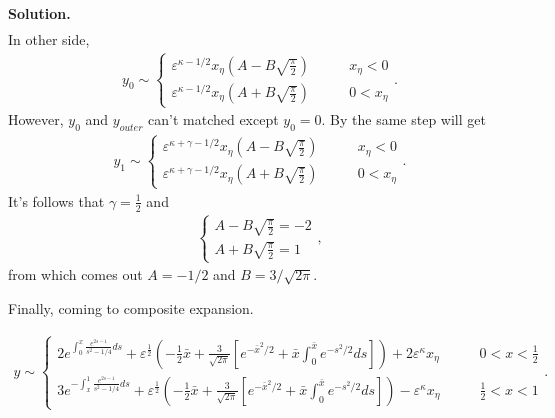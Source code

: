 \documentclass[a4paper]{book}
\newenvironment{solution}%
{\noindent\textbf{Solution.}}%
{\qedhere}
\numberwithin{equation}{chapter}
\theoremstyle{definition}
\begin{document}
\begin{solution}
\begin{align*}
  \end{align*}
  In other side,
  \begin{align*}
    y_0 \sim
    \begin{cases}
      \varepsilon^{\kappa - 1/2}x_\eta (A - B\sqrt{\frac{\pi}{2}})   &\qquad x_\eta < 0  \\
      \varepsilon^{\kappa - 1/2}x_\eta (A + B\sqrt{\frac{\pi}{2}})  &\qquad 0 < x_\eta
    \end{cases}.
  \end{align*}
  However, $y_0$ and $y_{outer}$ can't matched except $y_0 = 0$. By the same step will get
  \begin{align*}
    y_1 \sim
    \begin{cases}
      \varepsilon^{\kappa + \gamma - 1/2}x_\eta (A - B\sqrt{\frac{\pi}{2}})   &\qquad x_\eta < 0  \\
      \varepsilon^{\kappa + \gamma - 1/2}x_\eta (A + B\sqrt{\frac{\pi}{2}})  &\qquad 0 < x_\eta
    \end{cases}.
  \end{align*}
  It's follows that $\gamma = \frac{1}{2}$ and
  \begin{align*}
    \begin{cases}
      A - B\sqrt{\frac{\pi}{2}} = -2 \\
      A + B\sqrt{\frac{\pi}{2}} = 1
    \end{cases},
  \end{align*}
  from which comes out $A = -1/2$ and $B = 3/\sqrt{2\pi}$.


  Finally, coming to composite expansion.
  \begin{large}
  \begin{align*}
    y \sim
    \begin{cases}
      2e^{\int_0^x \frac{e^{2s-1}}{s^2 - 1/4}ds} + \varepsilon^\frac{1}{2} (-\frac{1}{2} \bar{x} + \frac{3}{\sqrt{2\pi}}[e^{-\bar{x}^2/2} + \bar{x}\int_0^{\bar{x}} e^{-s^2/2} ds]) + 2 \varepsilon^\kappa x_\eta \qquad & 0 < x < \frac{1}{2}  \\
      3e^{-\int_x^1 \frac{e^{2s-1}}{s^2 - 1/4}ds} + \varepsilon^\frac{1}{2} (-\frac{1}{2} \bar{x} + \frac{3}{\sqrt{2\pi}}[e^{-\bar{x}^2/2} + \bar{x}\int_0^{\bar{x}} e^{-s^2/2} ds]) - \varepsilon^\kappa x_\eta \qquad & \frac{1}{2} < x < 1
    \end{cases}.
  \end{align*}
  \end{large}
  


\end{solution}
\end{document}
